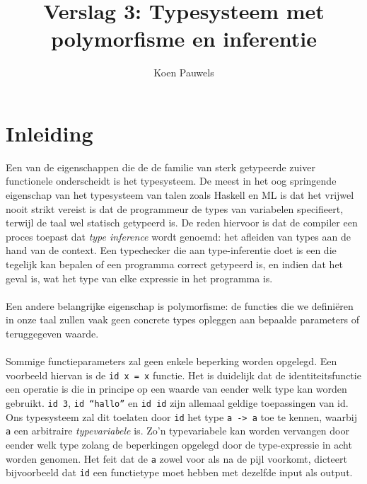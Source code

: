 \documentclass[a4paper,10pt]{article}
\begin{document}
\lstset{language=Haskell}
\title{Verslag 3: Typesysteem met polymorfisme en inferentie}
\author{Koen Pauwels}
\maketitle

\section{Inleiding}
Een van de eigenschappen die de de familie van sterk getypeerde zuiver functionele onderscheidt is het typesysteem.
De meest in het oog springende eigenschap van het typesysteem van talen zoals Haskell en ML is dat het vrijwel nooit strikt vereist is dat de programmeur de types van variabelen specifieert, terwijl de taal wel statisch getypeerd is.
De reden hiervoor is dat de compiler een proces toepast dat \emph{type inference} wordt genoemd: het afleiden van types aan de hand van de context.
Een typechecker die aan type-inferentie doet is een die tegelijk kan bepalen of een programma correct getypeerd is, en indien dat het geval is, wat het type van elke expressie in het programma is.
\paragraph{}
Een andere belangrijke eigenschap is polymorfisme: de functies die we defini{\"e}ren in onze taal zullen vaak geen concrete types opleggen aan bepaalde parameters of teruggegeven waarde.
\paragraph{}
Sommige functieparameters zal geen enkele beperking worden opgelegd.
Een voorbeeld hiervan is de \texttt{id x = x} functie.
Het is duidelijk dat de identiteitsfunctie een operatie is die in principe op een waarde van eender welk type kan worden gebruikt.
\texttt{id 3}, \texttt{id ``hallo''} en \texttt{id id} zijn allemaal geldige toepassingen van id.
Ons typesysteem zal dit toelaten door \texttt{id} het type \texttt{a -> a} toe te kennen, waarbij \texttt{a} een arbitraire \emph{typevariabele} is.
Zo'n typevariabele kan worden vervangen door eender welk type zolang de beperkingen opgelegd door de type-expressie in acht worden genomen.
Het feit dat de \texttt{a} zowel voor als na de pijl voorkomt, dicteert bijvoorbeeld dat \texttt{id} een functietype moet hebben met dezelfde input als output.
\end{document}

